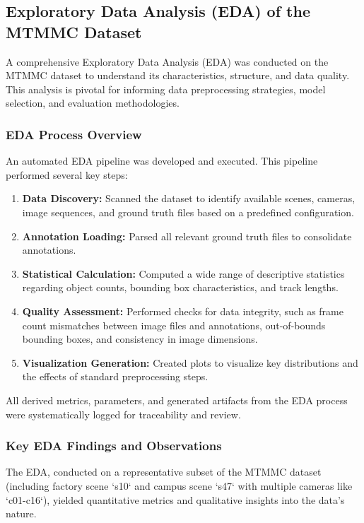 \subsection*{Exploratory Data Analysis (EDA) of the MTMMC Dataset}
\label{subsec:progress_eda}
A comprehensive Exploratory Data Analysis (EDA) was conducted on the MTMMC dataset to understand its characteristics, structure, and data quality. This analysis is pivotal for informing data preprocessing strategies, model selection, and evaluation methodologies.


\subsubsection*{EDA Process Overview}
An automated EDA pipeline was developed and executed. This pipeline performed several key steps:
\begin{enumerate}
    \item \textbf{Data Discovery:} Scanned the dataset to identify available scenes, cameras, image sequences, and ground truth files based on a predefined configuration.
    \item \textbf{Annotation Loading:} Parsed all relevant ground truth files to consolidate annotations.
    \item \textbf{Statistical Calculation:} Computed a wide range of descriptive statistics regarding object counts, bounding box characteristics, and track lengths.
    \item \textbf{Quality Assessment:} Performed checks for data integrity, such as frame count mismatches between image files and annotations, out-of-bounds bounding boxes, and consistency in image dimensions.
    \item \textbf{Visualization Generation:} Created plots to visualize key distributions and the effects of standard preprocessing steps.
\end{enumerate}
All derived metrics, parameters, and generated artifacts from the EDA process were systematically logged for traceability and review.

\subsubsection*{Key EDA Findings and Observations}
The EDA, conducted on a representative subset of the MTMMC dataset (including factory scene `s10` and campus scene `s47` with multiple cameras like `c01-c16`), yielded quantitative metrics and qualitative insights into the data's nature.

